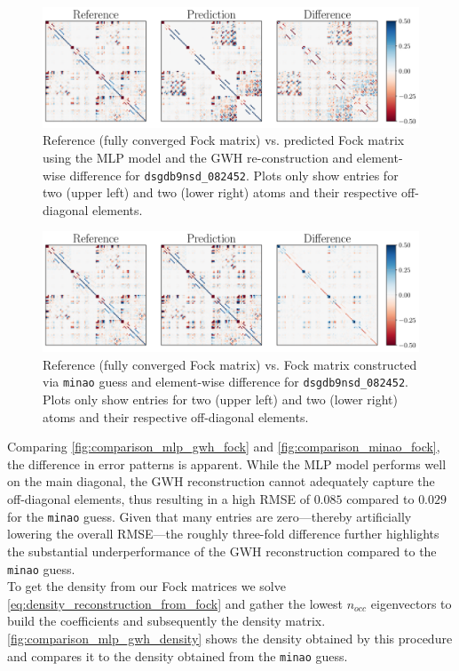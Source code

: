 \begin{figure}[H]
    \centering
    \includegraphics[width=\textwidth]{../fig/mlp_further_trials/fock_truth_vs_pred.pdf}
    \caption[MLP vs. reference Fock]{Reference (fully converged Fock matrix) vs. predicted Fock matrix using the MLP model and the GWH re-construction and element-wise difference for \texttt{dsgdb9nsd\_082452}. Plots only show entries for two  (upper left) and two  (lower right) atoms and their respective off-diagonal elements.}
    \label{fig:comparison_mlp_gwh_fock}
\end{figure}

\begin{figure}[H]
    \centering
    \includegraphics[width=\textwidth]{../fig/mlp_further_trials/fock_truth_vs_minao.pdf}
    \caption[\texttt{minao} vs. reference Fock]{Reference (fully converged Fock matrix) vs. Fock matrix constructed via \texttt{minao} guess and element-wise difference for \texttt{dsgdb9nsd\_082452}. Plots only show entries for two  (upper left) and two  (lower right) atoms and their respective off-diagonal elements.}
    \label{fig:comparison_minao_fock}
\end{figure}
Comparing \autoref{fig:comparison_mlp_gwh_fock} and \autoref{fig:comparison_minao_fock}, the difference in error patterns is apparent. While the MLP model performs well on the main diagonal, the GWH reconstruction cannot adequately capture the off-diagonal elements, thus resulting in a high RMSE of $0.085$ compared to $0.029$ for the \texttt{minao} guess. Given that many entries are zero—thereby artificially lowering the overall RMSE—the roughly three-fold difference further highlights the substantial underperformance of the GWH reconstruction compared to the \texttt{minao} guess.\\
To get the density from our Fock matrices we solve \autoref{eq:density_reconstruction_from_fock} and gather the lowest $n_{occ}$ eigenvectors to build the coefficients and subsequently the density matrix. \autoref{fig:comparison_mlp_gwh_density} shows the density obtained by this procedure and compares it to the density obtained from the \texttt{minao} guess.

